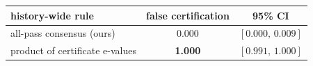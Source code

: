 \begin{tabular}{lcc}
\toprule
history-wide rule & false certification & 95\% CI\\
\midrule
all-pass consensus (ours) & 0.000 & $[0.000,\,0.009]$\\
product of certificate e-values & \textbf{1.000} & $[0.991,\,1.000]$\\
\bottomrule
\end{tabular}
